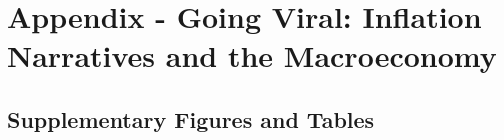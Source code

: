 \clearpage
\appendix
{}  %
\setcounter{page}{1}   %
\newpage
{} %
\section{Appendix - Going Viral: Inflation Narratives and the Macroeconomy}\label{sec:Appendix}

\subsection{Supplementary Figures and Tables}\label{subsec:Supplements}

